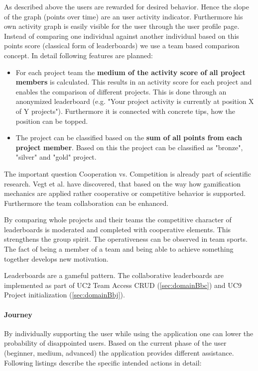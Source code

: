 As described above the users are rewarded for desired behavior. Hence the slope of the graph (points over time) are an user activity indicator. Furthermore his own activity graph is easily visible for the user through the user profile page.
Instead of comparing one individual against another individual based on this points score (classical form of leaderboards) we use a team based comparison concept. 
In detail following features are planned:
\begin{itemize}
	\item For each project team the \textbf{medium of the activity score of all project members} is calculated. This results in an activity score for each project and enables the comparison of different projects. This is done through an anonymized leaderboard (e.g. "Your project activity is currently at position X of Y projects"). Furthermore it is connected with concrete tips, how the position can be topped.
	\item The project can be classified based on the \textbf{sum of all points from each project member}. Based on this the project can be classified as "bronze", "silver" and "gold" project.
\end{itemize}

The important question Cooperation vs. Competition is already part of scientific research. Vegt et al. \cite{vegtDesigningGamificationGuide2015} have discovered, that based on the way how gamification mechanics are applied rather cooperative or competitive behavior is supported. Furthermore the team collaboration can be enhanced.

By comparing whole projects and their teams the competitive character of leaderboards is moderated and completed with cooperative elements. This strengthens the group spirit. The operativeness can be observed in team sports. The fact of being a member of a team and being able to achieve something together develops new motivation.

Leaderboards are a gameful pattern. 
The collaborative leaderboards are implemented as part of \ac{UC}2 Team Access CRUD (\ref{sec:domainBbc}) and \ac{UC}9 Project initialization (\ref{sec:domainBbj}).

\paragraph*{Journey}

By individually supporting the user while using the application one can lower the probability of disappointed users. Based on the current phase of the user (beginner, medium, advanced) the application provides different assistance. Following listings describe the specific intended actions in detail:

